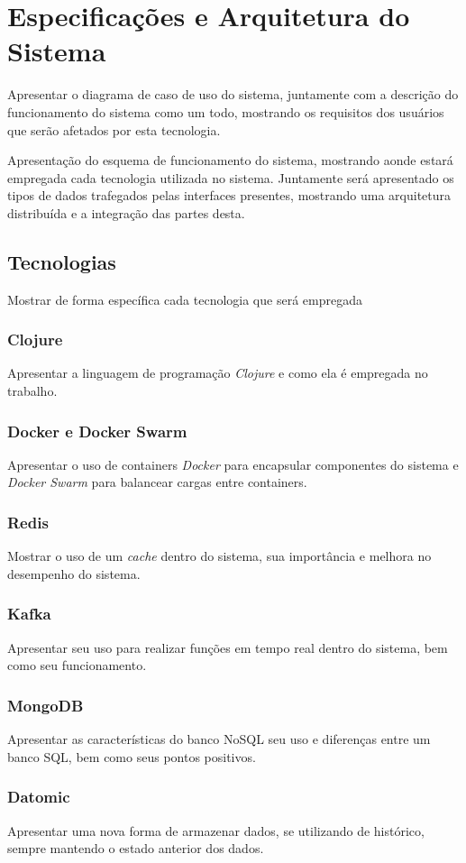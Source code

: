 \chapter{Especificações e Arquitetura do Sistema}
\label{chap:arquitetura}
Apresentar o diagrama de caso de uso do sistema, juntamente com a descrição do funcionamento do sistema como um todo, mostrando os requisitos dos usuários que serão afetados por esta tecnologia.

Apresentação do esquema de funcionamento do sistema, mostrando aonde estará empregada cada tecnologia utilizada no sistema. Juntamente será apresentado os tipos de dados trafegados pelas interfaces presentes, mostrando uma arquitetura distribuída e a integração das partes desta.

\section{Tecnologias}
\label{sec:tecnologias}
Mostrar de forma específica cada tecnologia que será empregada

\subsection{Clojure}
Apresentar a linguagem de programação \textit{Clojure} e como ela é empregada no trabalho.

\subsection{Docker e Docker Swarm}
Apresentar o uso de containers \textit{Docker} para encapsular componentes do sistema e \textit{Docker Swarm} para balancear cargas entre containers.

\subsection{Redis}
Mostrar o uso de um \textit{cache} dentro do sistema, sua importância e melhora no desempenho do sistema.

\subsection{Kafka}
Apresentar seu uso para realizar funções em tempo real dentro do sistema, bem como seu funcionamento.

\subsection{MongoDB}
Apresentar as características do banco NoSQL seu uso e diferenças entre um banco SQL, bem como seus pontos positivos.

\subsection{Datomic}
Apresentar uma nova forma de armazenar dados, se utilizando de histórico, sempre mantendo o estado anterior dos dados.

